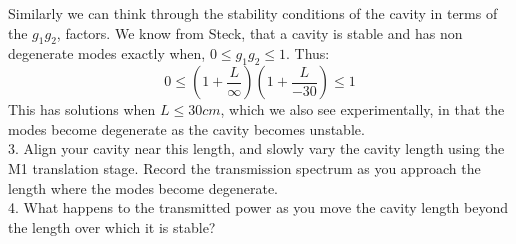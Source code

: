 \documentclass[11pt]{article}
\begin{document}
Similarly we can think through the stability conditions of the cavity in terms of the $g_1g_2$, factors. We know from Steck, that a cavity is stable and has non degenerate modes exactly when, $0 \leq g_1g_2 \leq 1$. Thus: \\
$$0 \leq (1+\frac{L}{\infty})(1+\frac{L}{-30}) \leq 1 $$ This has solutions when $L \leq 30 cm$, which we also see experimentally, in that the modes become degenerate as the cavity becomes unstable. \\

3. Align your cavity near this length, and slowly vary the cavity length using the M1 translation stage. Record the transmission spectrum as you approach the length where the modes become degenerate. \\

4. What happens to the transmitted power as you move the cavity length beyond the length over which it is stable?
\end{document}
